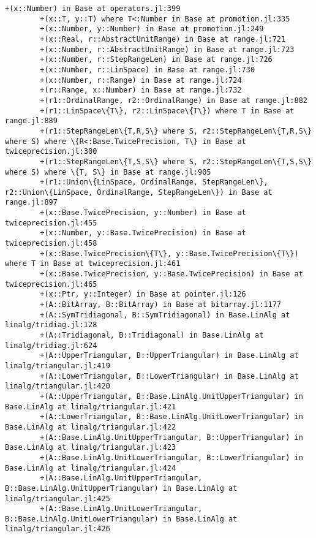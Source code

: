 \documentclass[11pt]{article}
\begin{document}
\begin{Verbatim}[commandchars=\\\{\}]
        +(x::Number) in Base at operators.jl:399
        +(x::T, y::T) where T<:Number in Base at promotion.jl:335
        +(x::Number, y::Number) in Base at promotion.jl:249
        +(x::Real, r::AbstractUnitRange) in Base at range.jl:721
        +(x::Number, r::AbstractUnitRange) in Base at range.jl:723
        +(x::Number, r::StepRangeLen) in Base at range.jl:726
        +(x::Number, r::LinSpace) in Base at range.jl:730
        +(x::Number, r::Range) in Base at range.jl:724
        +(r::Range, x::Number) in Base at range.jl:732
        +(r1::OrdinalRange, r2::OrdinalRange) in Base at range.jl:882
        +(r1::LinSpace\{T\}, r2::LinSpace\{T\}) where T in Base at range.jl:889
        +(r1::StepRangeLen\{T,R,S\} where S, r2::StepRangeLen\{T,R,S\} where S) where \{R<:Base.TwicePrecision, T\} in Base at twiceprecision.jl:300
        +(r1::StepRangeLen\{T,S,S\} where S, r2::StepRangeLen\{T,S,S\} where S) where \{T, S\} in Base at range.jl:905
        +(r1::Union\{LinSpace, OrdinalRange, StepRangeLen\}, r2::Union\{LinSpace, OrdinalRange, StepRangeLen\}) in Base at range.jl:897
        +(x::Base.TwicePrecision, y::Number) in Base at twiceprecision.jl:455
        +(x::Number, y::Base.TwicePrecision) in Base at twiceprecision.jl:458
        +(x::Base.TwicePrecision\{T\}, y::Base.TwicePrecision\{T\}) where T in Base at twiceprecision.jl:461
        +(x::Base.TwicePrecision, y::Base.TwicePrecision) in Base at twiceprecision.jl:465
        +(x::Ptr, y::Integer) in Base at pointer.jl:126
        +(A::BitArray, B::BitArray) in Base at bitarray.jl:1177
        +(A::SymTridiagonal, B::SymTridiagonal) in Base.LinAlg at linalg/tridiag.jl:128
        +(A::Tridiagonal, B::Tridiagonal) in Base.LinAlg at linalg/tridiag.jl:624
        +(A::UpperTriangular, B::UpperTriangular) in Base.LinAlg at linalg/triangular.jl:419
        +(A::LowerTriangular, B::LowerTriangular) in Base.LinAlg at linalg/triangular.jl:420
        +(A::UpperTriangular, B::Base.LinAlg.UnitUpperTriangular) in Base.LinAlg at linalg/triangular.jl:421
        +(A::LowerTriangular, B::Base.LinAlg.UnitLowerTriangular) in Base.LinAlg at linalg/triangular.jl:422
        +(A::Base.LinAlg.UnitUpperTriangular, B::UpperTriangular) in Base.LinAlg at linalg/triangular.jl:423
        +(A::Base.LinAlg.UnitLowerTriangular, B::LowerTriangular) in Base.LinAlg at linalg/triangular.jl:424
        +(A::Base.LinAlg.UnitUpperTriangular, B::Base.LinAlg.UnitUpperTriangular) in Base.LinAlg at linalg/triangular.jl:425
        +(A::Base.LinAlg.UnitLowerTriangular, B::Base.LinAlg.UnitLowerTriangular) in Base.LinAlg at linalg/triangular.jl:426

\end{Verbatim}
\end{document}
